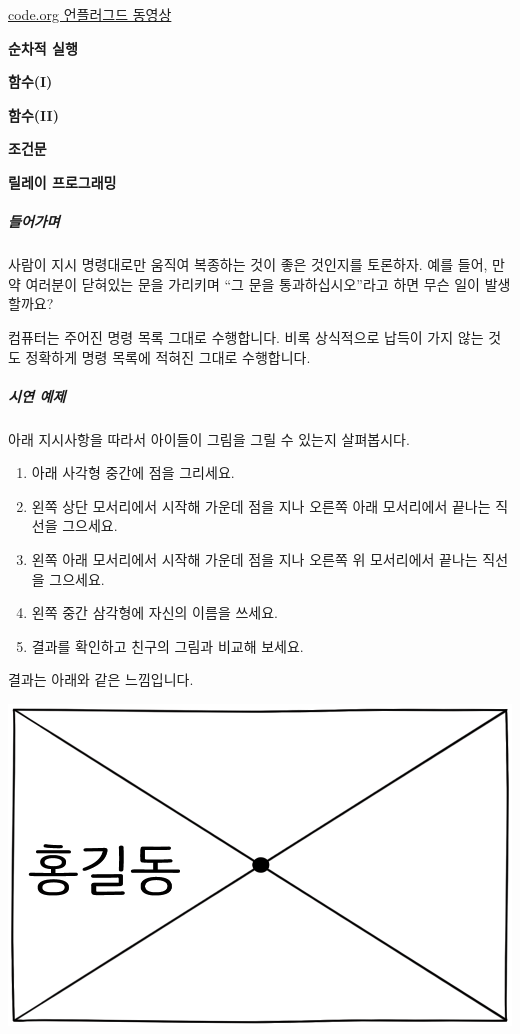 \documentclass[]{article}
\begin{document}

\href{http://www.code.org}{code.org 언플러그드 동영상}

\textbf{순차적 실행}

\textbf{함수(I)}

\textbf{함수(II)}

\textbf{조건문}

\textbf{릴레이 프로그래밍}

\subparagraph{들어가며}\label{section-177}

사람이 지시 명령대로만 움직여 복종하는 것이 좋은 것인지를 토론하자. 예를
들어, 만약 여러분이 닫혀있는 문을 가리키며 ``그 문을 통과하십시오''라고
하면 무슨 일이 발생할까요?

컴퓨터는 주어진 명령 목록 그대로 수행합니다. 비록 상식적으로 납득이 가지
않는 것도 정확하게 명령 목록에 적혀진 그대로 수행합니다.

\subparagraph{시연 예제}\label{section-178}

아래 지시사항을 따라서 아이들이 그림을 그릴 수 있는지 살펴봅시다.

\begin{enumerate}
\item
  아래 사각형 중간에 점을 그리세요.
\item
  왼쪽 상단 모서리에서 시작해 가운데 점을 지나 오른쪽 아래 모서리에서
  끝나는 직선을 그으세요.
\item
  왼쪽 아래 모서리에서 시작해 가운데 점을 지나 오른쪽 위 모서리에서
  끝나는 직선을 그으세요.
\item
  왼쪽 중간 삼각형에 자신의 이름을 쓰세요.
\item
  결과를 확인하고 친구의 그림과 비교해 보세요.
\end{enumerate}

결과는 아래와 같은 느낌입니다.

\includegraphics{csunplugged/03-part/img/ch13-language/12-language-02-name.png}
\end{document}
